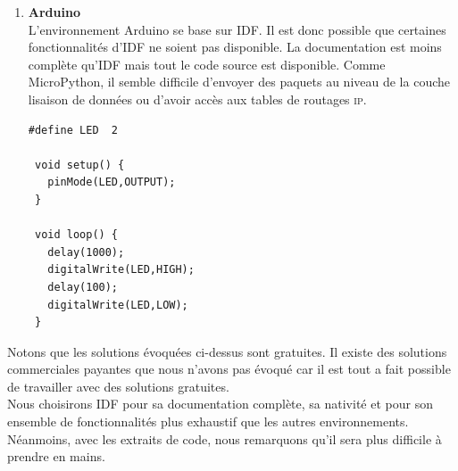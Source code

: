 \begin{enumerate}
\begin{verbatim}
            #define BLINK_GPIO CONFIG_BLINK_GPIO
            
            void app_main(void)
            {
                /*Configure the IOMUX register for pad BLINK_GPIO*/
                gpio_pad_select_gpio(BLINK_GPIO);
                /* Set the GPIO as a push/pull output */
                gpio_set_direction(BLINK_GPIO, GPIO_MODE_OUTPUT);
                while(1) {
                    /* Blink off (output low) */
                    printf("Turning off the LED\n");
                    gpio_set_level(BLINK_GPIO, 0);
                    vTaskDelay(1000 / portTICK_PERIOD_MS);
                    /* Blink on (output high) */
                printf("Turning on the LED\n");
                    gpio_set_level(BLINK_GPIO, 1);
                    vTaskDelay(1000 / portTICK_PERIOD_MS);
                }
            }
            \end{verbatim}
        \item \textbf{Arduino}\cite{aruino-esp32}\\
            L'environnement Arduino se base sur IDF. Il est donc possible que certaines
            fonctionnalités d'IDF ne soient pas disponible. 
            La documentation est moins complète qu'IDF mais tout le code source est disponible.
            Comme MicroPython, il semble difficile d'envoyer des paquets au niveau de la
            couche lisaison de données ou d'avoir accès aux tables de routages \textsc{ip}.\\
            \begin{verbatim}
#define LED  2
 
 void setup() {
   pinMode(LED,OUTPUT);
 }
  
 void loop() {
   delay(1000);
   digitalWrite(LED,HIGH);
   delay(100);
   digitalWrite(LED,LOW);
 }

            \end{verbatim}
    \end{enumerate}
    \vspace{1cm}
    Notons que les solutions évoquées ci-dessus sont gratuites. Il existe des solutions
    commerciales payantes que nous n'avons pas évoqué car il est tout a fait possible de
    travailler avec des solutions gratuites.\\
    
    Nous choisirons IDF pour sa documentation complète, sa nativité et pour son ensemble
    de fonctionnalités plus exhaustif que les autres environnements. Néanmoins, 
    avec les extraits de code, nous remarquons qu'il sera plus difficile à prendre en mains.

